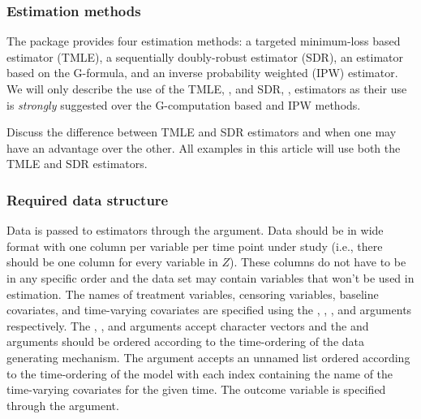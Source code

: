 \documentclass[]{jss}
\begin{document}
\hypertarget{estimation-methods}{%
\subsubsection{Estimation methods}\label{estimation-methods}}

The  package provides four estimation methods: a targeted
minimum-loss based estimator (TMLE), a sequentially doubly-robust
estimator (SDR), an estimator based on the G-formula, and an inverse
probability weighted (IPW) estimator. We will only describe the use of
the TMLE, , and SDR, , estimators as
their use is \textit{strongly} suggested over the G-computation based
and IPW methods.

Discuss the difference between TMLE and SDR estimators and when one may
have an advantage over the other. All examples in this article will use
both the TMLE and SDR estimators.

\hypertarget{required-data-structure}{%
\subsubsection{Required data structure}\label{required-data-structure}}

Data is passed to  estimators through the 
argument. Data should be in wide format with one column per variable per
time point under study (i.e., there should be one column for every
variable in \(Z\)). These columns do not have to be in any specific
order and the data set may contain variables that won't be used in
estimation. The names of treatment variables, censoring variables,
baseline covariates, and time-varying covariates are specified using the
, , , and  arguments
respectively. The , , and  arguments
accept character vectors and the  and  arguments
should be ordered according to the time-ordering of the data generating
mechanism. The  argument accepts an unnamed list ordered
according to the time-ordering of the model with each index containing
the name of the time-varying covariates for the given time. The outcome
variable is specified through the  argument.
\end{document}
